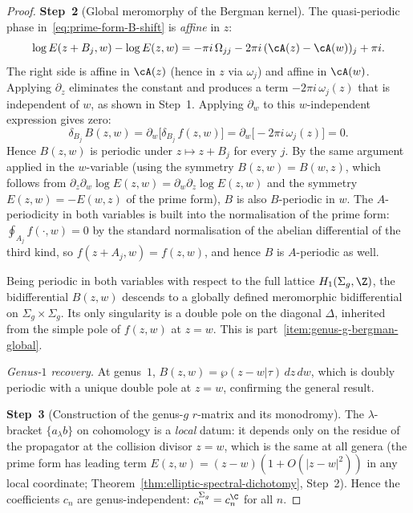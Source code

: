 \begin{proof}
\medskip
\textbf{Step~2} (Global meromorphy of the Bergman kernel).
The quasi-periodic phase
in~\eqref{eq:prime-form-B-shift} is \emph{affine} in $z$:
\[
\log E(z + B_j, w) - \log E(z,w)
= -\pi i\, \Omega_{jj} - 2\pi i\, (\cA(z) - \cA(w))_j
 + \pi i.
\]
The right side is affine in $\cA(z)$ (hence in $z$ via $\omega_j$)
and affine in $\cA(w)$. Applying $\partial_z$ eliminates the
constant and produces a term $-2\pi i\, \omega_j(z)$
that is independent of $w$, as shown in Step~1. Applying
$\partial_w$ to this $w$-independent expression gives zero:
\[
\delta_{B_j}\, B(z,w)
= \partial_w \bigl[\delta_{B_j}\, f(z,w)\bigr]
= \partial_w \bigl[-2\pi i\, \omega_j(z)\bigr]
= 0.
\]
Hence $B(z,w)$ is periodic under $z \mapsto z + B_j$ for every
$j$. By the same argument applied in the $w$-variable (using
the symmetry $B(z,w) = B(w,z)$, which follows from
$\partial_z \partial_w \log E(z,w) = \partial_w \partial_z \log
E(z,w)$ and the symmetry $E(z,w) = -E(w,z)$ of the prime form),
$B$ is also $B$-periodic in $w$.
The $A$-periodicity in both variables is built into the
normalisation of the prime form: $\oint_{A_j} f(\cdot, w) = 0$
by the standard normalisation of the abelian differential
of the third kind, so $f(z + A_j, w) = f(z,w)$, and hence
$B$ is $A$-periodic as well.

Being periodic in both variables with respect to the full
lattice $H_1(\Sigma_g, \Z)$, the bidifferential $B(z,w)$
descends to a globally defined meromorphic bidifferential on
$\Sigma_g \times \Sigma_g$. Its only singularity is a double
pole on the diagonal $\Delta$, inherited from the simple pole
of $f(z,w)$ at $z = w$. This is
part~\ref{item:genus-g-bergman-global}.

\emph{Genus-$1$ recovery.}
At genus~$1$, $B(z,w) = \wp(z - w|\tau)\, dz\, dw$,
which is doubly periodic with a unique double pole at $z = w$,
confirming the general result.

\medskip
\textbf{Step~3} (Construction of the genus-$g$ $r$-matrix and its
monodromy).
The $\lambda$-bracket $\{a {}_\lambda b\}$ on cohomology is a
\emph{local} datum: it depends only on the residue of the propagator
at the collision divisor $z = w$, which is the same at all genera
(the prime form has leading term $E(z,w) = (z - w)(1 + O(|z-w|^2))$
in any local coordinate;
Theorem~\ref{thm:elliptic-spectral-dichotomy}, Step~2).
Hence the coefficients $c_n$ are
genus-independent: $c_n^{\Sigma_g} = c_n^{\C}$ for all $n$.


\end{proof}
